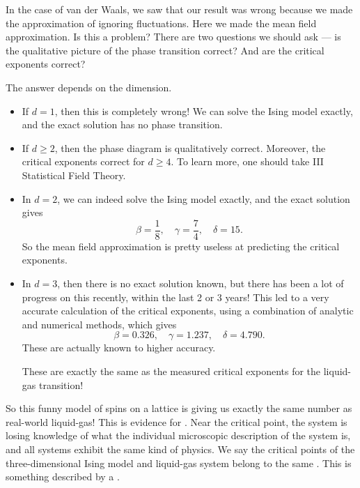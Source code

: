 \documentclass[a4paper]{article}
\begin{document}
In the case of van der Waals, we saw that our result was wrong because we made the approximation of ignoring fluctuations. Here we made the mean field approximation. Is this a problem? There are two questions we should ask --- is the qualitative picture of the phase transition correct? And are the critical exponents correct?

The answer depends on the dimension.
\begin{itemize}
  \item If $d = 1$, then this is completely wrong! We can solve the Ising model exactly, and the exact solution has no phase transition.
  \item If $d \geq 2$, then the phase diagram is qualitatively correct. Moreover, the critical exponents correct for $d \geq 4$. To learn more, one should take III Statistical Field Theory.
  \item In $d = 2$, we can indeed solve the Ising model exactly, and the exact solution gives
    \[
      \beta = \frac{1}{8},\quad \gamma = \frac{7}{4},\quad \delta = 15.
    \]
    So the mean field approximation is pretty useless at predicting the critical exponents.
  \item In $d = 3$, then there is no exact solution known, but there has been a lot of progress on this recently, within the last 2 or 3 years! This led to a very accurate calculation of the critical exponents, using a combination of analytic and numerical methods, which gives
    \[
      \beta = 0.326,\quad \gamma = 1.237,\quad \delta = 4.790.
    \]
    These are actually known to higher accuracy.

    These are exactly the same as the measured critical exponents for the liquid-gas transition!
\end{itemize}
So this funny model of spins on a lattice is giving us exactly the same number as real-world liquid-gas! This is evidence for . Near the critical point, the system is losing knowledge of what the individual microscopic description of the system is, and all systems exhibit the same kind of physics. We say the critical points of the three-dimensional Ising model and liquid-gas system belong to the same . This is something described by a .
\end{document}
